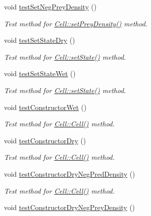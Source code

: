 \begin{DoxyCompactItemize}
void \hyperlink{class_test_cell_af9f307b147e9b64f143e21f263d35be3}{test\+Set\+Neg\+Prey\+Density} ()
\begin{DoxyCompactList}\small\item\em Test method for \hyperlink{class_cell_afd3a85027b67dfd4295e2e50253c1058}{Cell\+::set\+Prey\+Density()} method. \end{DoxyCompactList}\item 
void \hyperlink{class_test_cell_ab72285a024d96d11fabf2261400cb2b2}{test\+Set\+State\+Dry} ()
\begin{DoxyCompactList}\small\item\em Test method for \hyperlink{class_cell_ac388ff95a4d94da1497847ead859f258}{Cell\+::set\+State()} method. \end{DoxyCompactList}\item 
void \hyperlink{class_test_cell_a62ea1c29983f63087056e0fc374e9fd8}{test\+Set\+State\+Wet} ()
\begin{DoxyCompactList}\small\item\em Test method for \hyperlink{class_cell_ac388ff95a4d94da1497847ead859f258}{Cell\+::set\+State()} method. \end{DoxyCompactList}\item 
void \hyperlink{class_test_cell_afa94f24a4f02e13167bfda0dd1516272}{test\+Constructor\+Wet} ()
\begin{DoxyCompactList}\small\item\em Test method for \hyperlink{class_cell_afc0a4cece64b7689425fa81a4f6ef2e2}{Cell\+::\+Cell()} method. \end{DoxyCompactList}\item 
void \hyperlink{class_test_cell_a7c80b33b42263cfa22c782ae0bf2384c}{test\+Constructor\+Dry} ()
\begin{DoxyCompactList}\small\item\em Test method for \hyperlink{class_cell_afc0a4cece64b7689425fa81a4f6ef2e2}{Cell\+::\+Cell()} method. \end{DoxyCompactList}\item 
void \hyperlink{class_test_cell_a3c7de5784989a8b9c2f78f88aed24c52}{test\+Constructor\+Dry\+Neg\+Pred\+Density} ()
\begin{DoxyCompactList}\small\item\em Test method for \hyperlink{class_cell_afc0a4cece64b7689425fa81a4f6ef2e2}{Cell\+::\+Cell()} method. \end{DoxyCompactList}\item 
void \hyperlink{class_test_cell_adcbb2fc8a03dddd8366643f59fdb963c}{test\+Constructor\+Dry\+Neg\+Prey\+Density} ()

\end{DoxyCompactItemize}
